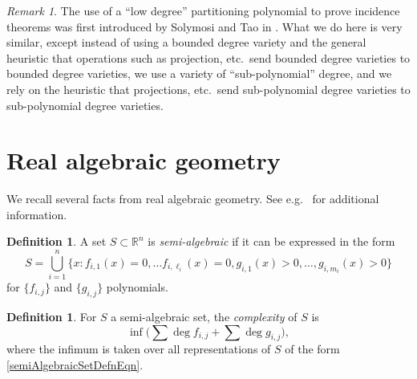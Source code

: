\documentclass[reqno]{amsart}
\theoremstyle{definition}
\newtheorem{defn}[thm]{Definition}
\theoremstyle{remark}
\newtheorem{remark}[thm]{Remark}
\theoremstyle{remark}
\newcommand{\RR}{\mathbb{R}}
\begin{document}
\begin{remark}
The use of a ``low degree'' partitioning polynomial to prove incidence theorems was first introduced by Solymosi and Tao in \cite{Solymosi}. What we do here is very similar, except instead of using a bounded degree variety and the general heuristic that operations such as projection, etc.~send bounded degree varieties to bounded degree varieties, we use a variety of ``sub-polynomial'' degree, and we rely on the heuristic that projections, etc.~send sub-polynomial degree varieties to sub-polynomial degree varieties.
\end{remark}


\appendix
\section{Real algebraic geometry}\label{realAlgGeoAppendix}
We recall several facts from real algebraic geometry. See e.g.~\cite{Basu,Bochnak} for additional information.

\begin{defn}
A set $S\subset\RR^n$ is \emph{semi-algebraic} if it can be expressed in the form
\begin{equation}\label{semiAlgebraicSetDefnEqn}
S=\bigcup_{i=1}^n \{x\colon f_{i,1}(x)=0,\ldots
f_{i,\ell_i}(x)=0,g_{i,1}(x)>0,\ldots,g_{i,m_i}(x)>0\}
\end{equation}
for $\{f_{i,j}\}$ and $\{g_{i,j}\}$ polynomials.
\end{defn}
\begin{defn}
For $S$ a semi-algebraic set, the \emph{complexity} of $S$ is
\begin{equation}
\inf\Big(\sum \deg f_{i,j}+\sum\deg g_{i,j}\Big),
\end{equation}
where the infimum is taken over all representations of $S$ of the form \eqref{semiAlgebraicSetDefnEqn}.
\end{defn}
\end{document}
